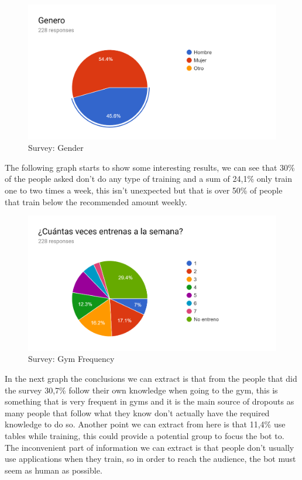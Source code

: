 \begin{center}
	\begin{figure}[h!]
		\centering
		\includegraphics[scale=0.25]{./images/4-genero}
		\caption{Survey: Gender}
		\label{4_genero}
	\end{figure}
\end{center}

The following graph starts to show some interesting results, we can see that 30\% of the people asked don’t do any type of training and a sum of 24,1\% only train one to two times a week, this isn’t unexpected but that is over 50\% of people that train below the recommended amount weekly.

\begin{center}
	\begin{figure}[h!]
		\centering
		\includegraphics[scale=1]{./images/4-exe-freq}
		\caption{Survey: Gym Frequency}
		\label{4_exe_freq}
	\end{figure}
\end{center}

In the next graph the conclusions we can extract is that from the people that did the survey 30,7\% follow their own knowledge when going to the gym, this is something that is very frequent in gyms and it is the main source of dropouts as many people that follow what they know don’t actually have the required knowledge to do so. Another point we can extract from here is that 11,4\% use tables while training, this could provide a potential group to focus the bot to. The inconvenient part of information we can extract is that people don’t usually use applications when they train, so in order to reach the audience, the bot must seem as human as possible.

